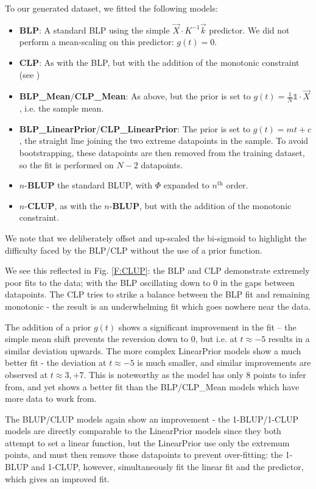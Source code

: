 \documentclass[]{article}
\begin{document}
		To our generated dataset, we fitted the following models:
		\begin{itemize}
			\item \textbf{BLP}: A standard BLP using the simple $\vec{X} \cdot K^{-1} \vec{k}$ predictor. We did not perform a mean-scaling on this predictor: $g(t) = 0$.
			\item \textbf{CLP}: As with the BLP, but with the addition of the monotonic constraint (see )
			\item \textbf{BLP\_Mean}/\textbf{CLP\_Mean}: As above, but the prior is set to $g(t) = \frac{1}{N} \mathds{1} \cdot \vec{X}$, i.e. the sample mean.
			\item  \textbf{BLP\_LinearPrior}/\textbf{CLP\_LinearPrior}: The prior is set to $g(t) = mt + c$, the straight line joining the two extreme datapoints in the sample. To avoid bootstrapping, these datapoints are then removed from the training dataset, so the fit is performed on $N-2$ datapoints.
			\item $n$-\textbf{BLUP} the standard BLUP, with $\Phi$ expanded to $n^\text{th}$ order. 
			\item $n$-\textbf{CLUP}, as with the $n$-\textbf{BLUP}, but with the addition of the monotonic constraint.
		\end{itemize}

		We note that we deliberately offset and up-scaled the bi-sigmoid to highlight the difficulty faced by the BLP/CLP without the use of a prior function.

		We see this reflected in Fig. \ref{F:CLUP}: the BLP and CLP demonstrate extremely poor fits to the data; with the BLP oscillating down to 0 in the gaps between datapoints. The CLP tries to strike a balance between the BLP fit and remaining monotonic - the result is an underwhelming fit which goes nowhere near the data. 
		
		The addition of a prior $g(t)$ shows a significant improvement in the fit -- the simple mean shift prevents the reversion down to 0, but i.e. at $t \approx -5$ results in a similar deviation upwards. The more complex LinearPrior models show a much better fit - the deviation at $t \approx -5$ is much smaller, and similar improvements are observed at $t \approx3,+7$. This is noteworthy as the model has only 8 points to infer from, and yet shows a better fit than the BLP/CLP\_Mean models which have more data to work from.
		
		The BLUP/CLUP models again show an improvement - the 1-BLUP/1-CLUP models are directly comparable to the LinearPrior models since they both attempt to set a linear function, but the LinearPrior use only the extremum points, and must then remove those datapoints to prevent over-fitting: the 1-BLUP and 1-CLUP, however, simultaneously fit the linear fit and the predictor, which gives an improved fit. 
\end{document}
